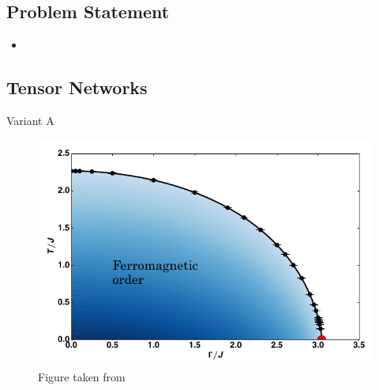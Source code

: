 
\subsection{Problem Statement}

\begin{frame}
    \begin{itemize}
        \item
    \end{itemize}

\end{frame}

\subsection{Tensor Networks}

\begin{frame}

\end{frame}

\begin{frame}{Variant A}
    \begin{figure}
        \centering
        \includegraphics[width=0.75 \linewidth]{../Figuren/phsyics/2disingphase.png}
        \caption{Figure taken from \cite{Hesselmann2016}  }

    \end{figure}

\end{frame}
